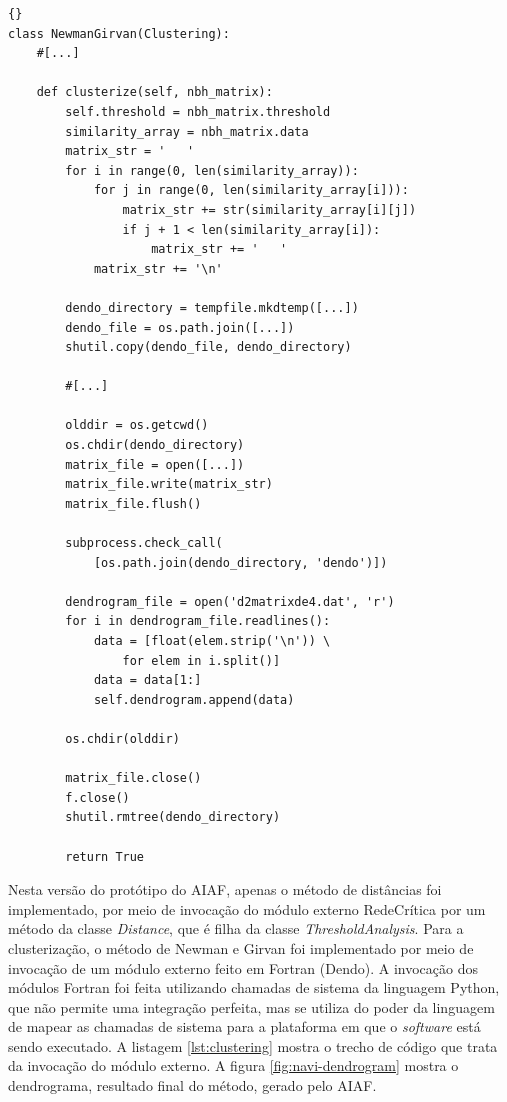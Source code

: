 \lstset{language=python}
\lstset{commentstyle=\textit}
\begin{lstlisting}[frame=trbl, caption=Clusterização usando o método de Newman e Girvan,label=lst:clustering]{}
class NewmanGirvan(Clustering):
    #[...]
        
    def clusterize(self, nbh_matrix):
        self.threshold = nbh_matrix.threshold
        similarity_array = nbh_matrix.data
        matrix_str = '   '
        for i in range(0, len(similarity_array)):
            for j in range(0, len(similarity_array[i])):
                matrix_str += str(similarity_array[i][j])
                if j + 1 < len(similarity_array[i]):
                    matrix_str += '   '
            matrix_str += '\n'
        
        dendo_directory = tempfile.mkdtemp([...])
        dendo_file = os.path.join([...])
        shutil.copy(dendo_file, dendo_directory)
        
        #[...]
        
        olddir = os.getcwd()
        os.chdir(dendo_directory)
        matrix_file = open([...])
        matrix_file.write(matrix_str)
        matrix_file.flush()
        
        subprocess.check_call(
            [os.path.join(dendo_directory, 'dendo')])
        
        dendrogram_file = open('d2matrixde4.dat', 'r')
        for i in dendrogram_file.readlines():
            data = [float(elem.strip('\n')) \
                for elem in i.split()]
            data = data[1:]
            self.dendrogram.append(data)
        
        os.chdir(olddir)
        
        matrix_file.close()
        f.close()
        shutil.rmtree(dendo_directory)
        
        return True
\end{lstlisting}

Nesta versão do protótipo do AIAF, apenas o método de distâncias foi implementado, por meio de invocação do módulo externo RedeCrítica por um método da
classe \textit{Distance}, que é filha da classe \textit{ThresholdAnalysis}. Para a clusterização, o método de Newman e Girvan foi implementado por meio
de invocação de um módulo externo feito em Fortran (Dendo). A invocação dos módulos Fortran foi feita utilizando chamadas de sistema da linguagem Python,
que não permite uma integração perfeita, mas se utiliza do poder da linguagem de mapear as chamadas de sistema para a plataforma em que o \textit{software}
está sendo executado. A listagem \ref{lst:clustering} mostra o trecho de código que trata da invocação do módulo externo. A figura \ref{fig:navi-dendrogram}
mostra o dendrograma, resultado final do método, gerado pelo AIAF.

